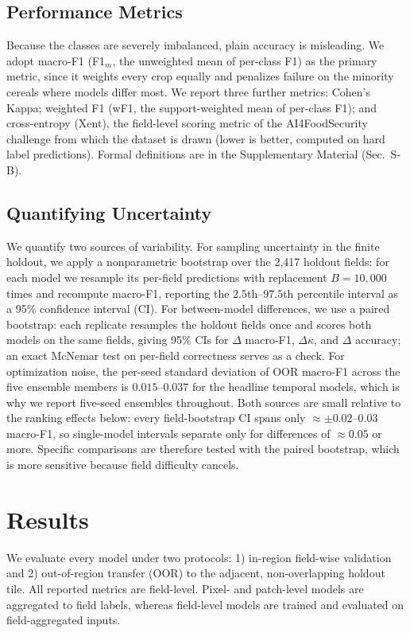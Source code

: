 \documentclass[preprint,authoryear]{elsarticle}
\begin{document}
\subsection{Performance Metrics}
\label{sec:metrics}
Because the classes are severely imbalanced, plain accuracy is misleading. We adopt macro-F1 (F1$_m$, the unweighted mean of per-class F1) as the primary metric, since it weights every crop equally and penalizes failure on the minority cereals where models differ most. We report three further metrics: Cohen's Kappa; weighted F1 (wF1, the support-weighted mean of per-class F1); and cross-entropy (Xent), the field-level scoring metric of the AI4FoodSecurity challenge \citep{ai4foodsecurity} from which the dataset is drawn (lower is better, computed on hard label predictions). Formal definitions are in the Supplementary Material (Sec.~S-B).

\subsection{Quantifying Uncertainty}
We quantify two sources of variability. For sampling uncertainty in the finite holdout, we apply a nonparametric bootstrap over the 2{,}417 holdout fields: for each model we resample its per-field predictions with replacement $B=10{,}000$ times and recompute macro-F1, reporting the $2.5$th--$97.5$th percentile interval as a 95\% confidence interval (CI). For between-model differences, we use a paired bootstrap: each replicate resamples the holdout fields once and scores both models on the same fields, giving 95\% CIs for $\Delta$ macro-F1, $\Delta\kappa$, and $\Delta$ accuracy; an exact McNemar test on per-field correctness serves as a check. For optimization noise, the per-seed standard deviation of OOR macro-F1 across the five ensemble members is $0.015$--$0.037$ for the headline temporal models, which is why we report five-seed ensembles throughout. Both sources are small relative to the ranking effects below: every field-bootstrap CI spans only ${\approx}{\pm}0.02$--$0.03$ macro-F1, so single-model intervals separate only for differences of ${\approx}0.05$ or more. Specific comparisons are therefore tested with the paired bootstrap, which is more sensitive because field difficulty cancels.

\section{Results}
\label{sec:results}
We evaluate every model under two protocols: 1) in-region field-wise validation and 2) out-of-region transfer (OOR) to the adjacent, non-overlapping holdout tile. All reported metrics are field-level. Pixel- and patch-level models are aggregated to field labels, whereas field-level models are trained and evaluated on field-aggregated inputs.
\end{document}
